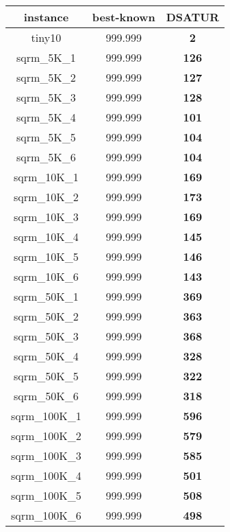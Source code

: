\begin{tabular}{cc||c}
instance & best-known & DSATUR \\ 
 \hline 
tiny10           & 999.999          & {\bf 2}         \\ 
sqrm\_5K\_1        & 999.999          & {\bf 126}       \\ 
sqrm\_5K\_2        & 999.999          & {\bf 127}       \\ 
sqrm\_5K\_3        & 999.999          & {\bf 128}       \\ 
sqrm\_5K\_4        & 999.999          & {\bf 101}       \\ 
sqrm\_5K\_5        & 999.999          & {\bf 104}       \\ 
sqrm\_5K\_6        & 999.999          & {\bf 104}       \\ 
sqrm\_10K\_1       & 999.999          & {\bf 169}       \\ 
sqrm\_10K\_2       & 999.999          & {\bf 173}       \\ 
sqrm\_10K\_3       & 999.999          & {\bf 169}       \\ 
sqrm\_10K\_4       & 999.999          & {\bf 145}       \\ 
sqrm\_10K\_5       & 999.999          & {\bf 146}       \\ 
sqrm\_10K\_6       & 999.999          & {\bf 143}       \\ 
sqrm\_50K\_1       & 999.999          & {\bf 369}       \\ 
sqrm\_50K\_2       & 999.999          & {\bf 363}       \\ 
sqrm\_50K\_3       & 999.999          & {\bf 368}       \\ 
sqrm\_50K\_4       & 999.999          & {\bf 328}       \\ 
sqrm\_50K\_5       & 999.999          & {\bf 322}       \\ 
sqrm\_50K\_6       & 999.999          & {\bf 318}       \\ 
sqrm\_100K\_1      & 999.999          & {\bf 596}       \\ 
sqrm\_100K\_2      & 999.999          & {\bf 579}       \\ 
sqrm\_100K\_3      & 999.999          & {\bf 585}       \\ 
sqrm\_100K\_4      & 999.999          & {\bf 501}       \\ 
sqrm\_100K\_5      & 999.999          & {\bf 508}       \\ 
sqrm\_100K\_6      & 999.999          & {\bf 498}       \\ 

\end{tabular}
